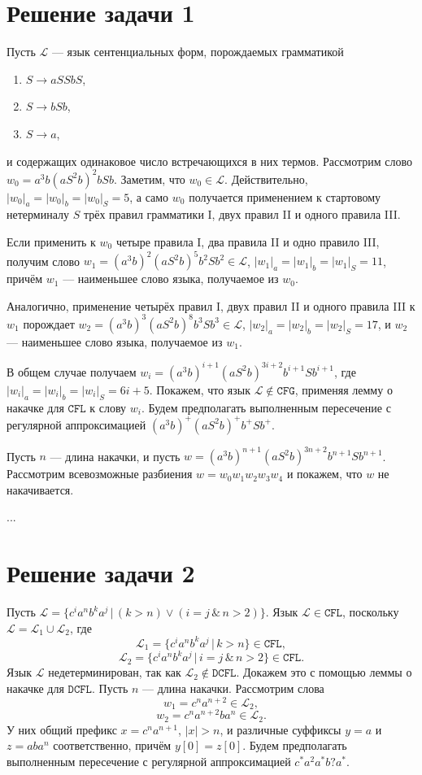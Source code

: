 \documentclass{article}
\begin{document}
\section{Решение задачи 1}

Пусть $\mathcal{L}$ --- язык сентенциальных форм, порождаемых грамматикой
\begin{enumerate}[I]
  \item $S \to aSSbS$,
  \item $S \to bSb$,
  \item $S \to a$,
\end{enumerate}
и содержащих одинаковое число встречающихся в них термов. Рассмотрим слово
$w_0 = a^3 b (a S^2 b)^2 b S b$. Заметим, что $w_0 \in \mathcal{L}$.
Действительно, $|w_0|_a = |w_0|_b = |w_0|_S = 5$, а само $w_0$ получается
применением к стартовому нетерминалу $S$ трёх правил грамматики I, двух правил
II и одного правила III.

Если применить к $w_0$ четыре правила I, два правила II и одно правило III,
получим слово $w_1 = (a^3 b)^2 (a S^2 b)^5 b^2 S b^2 \in \mathcal{L}$,
$|w_1|_a = |w_1|_b = |w_1|_S = 11$, причём $w_1$ --- наименьшее слово языка,
получаемое из $w_0$.

Аналогично, применение четырёх правил I, двух правил II и одного правила III
к $w_1$ порождает $w_2 = (a^3 b)^3 (a S^2 b)^8 b^3 S b^3 \in \mathcal{L}$,
$|w_2|_a = |w_2|_b = |w_2|_S = 17$, и $w_2$ --- наименьшее слово языка,
получаемое из $w_1$.

В общем случае получаем $w_i = (a^3 b)^{i+1} (a S^2 b)^{3i+2} b^{i+1} S b^{i+1}$,
где $|w_i|_a = |w_i|_b = |w_i|_S = 6i + 5$. Покажем, что язык
$\mathcal{L} \notin \mathtt{CFG}$, применяя лемму о накачке для $\mathtt{CFL}$
к слову $w_i$. Будем предполагать выполненным пересечение с регулярной
аппроксимацией $(a^3 b)^+ (a S^2 b)^+ b^+ S b^+$.

Пусть $n$ --- длина накачки, и пусть
$w = (a^3 b)^{n+1} (a S^2 b)^{3n+2} b^{n+1} S b^{n+1}$. Рассмотрим всевозможные
разбиения $w = w_0 w_1 w_2 w_3 w_4$ и покажем, что $w$ не накачивается.

...

\section{Решение задачи 2}

Пусть $\mathcal{L} = \{c^i a^n b^k a^j \, | \, (k > n) \lor (i = j \, \& \,
n > 2)\}$. Язык $\mathcal{L} \in \mathtt{CFL}$, поскольку $\mathcal{L} =
\mathcal{L}_1 \cup \mathcal{L}_2$, где
\[\mathcal{L}_1 = \{c^i a^n b^k a^j \, | \, k > n\} \in \mathtt{CFL},\]
\[\mathcal{L}_2 = \{c^i a^n b^k a^j \, | \, i = j \, \& \, n > 2 \} \in \mathtt{CFL}.\]
Язык $\mathcal{L}$ недетерминирован, так как $\mathcal{L}_2 \notin \mathtt{DCFL}$.
Докажем это с помощью леммы о накачке для $\mathtt{DCFL}$. Пусть $n$ --- длина
накачки. Рассмотрим слова
\[w_1 = c^n a^{n+2} \in \mathcal{L}_2,\]
\[w_2 = c^n a^{n+2} b a^n \in \mathcal{L}_2.\]
У них общий префикс $x = c^n a^{n+1}$, $|x| > n$, и различные суффиксы
$y = a$ и $z = a b a^n$ соответственно, причём $y[0] = z[0]$. Будем предполагать
выполненным пересечение с регулярной аппроксимацией $c^* a^2 a^* b? a^*$.
\end{document}
